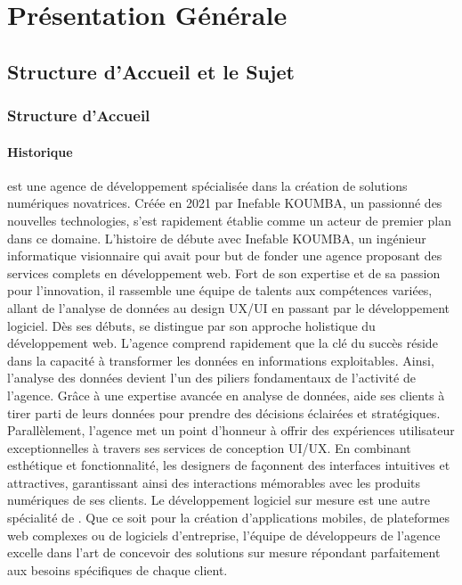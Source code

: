 \part{Présentation Générale}
\chapter{Structure d’Accueil et le Sujet}
\section{Structure d’Accueil}
\subsection{Historique}

\mazf est une agence de développement spécialisée dans la création de solutions
numériques novatrices. Créée en 2021 par Inefable KOUMBA, un passionné des nouvelles
technologies, \mazf s'est rapidement établie comme un acteur de premier plan dans ce domaine.
L'histoire de \mazf débute avec Inefable KOUMBA, un ingénieur informatique
visionnaire qui avait pour but de fonder une agence proposant des services complets
en développement web. Fort de son expertise et de sa passion pour l’innovation,
il rassemble une équipe de talents aux compétences variées, allant de l’analyse
de données au design UX/UI en passant par le développement logiciel.
Dès ses débuts, \mazf se distingue par son approche holistique du développement
web. L’agence comprend rapidement que la clé du succès réside dans la capacité à
transformer les données en informations exploitables. Ainsi, l’analyse des données
devient l’un des piliers fondamentaux de l’activité de l’agence. Grâce à une
expertise avancée en analyse de données, \mazf aide ses clients à tirer
parti de leurs données pour prendre des décisions éclairées et stratégiques.
Parallèlement, l’agence met un point d’honneur à offrir des expériences utilisateur
exceptionnelles à travers ses services de conception UI/UX. En combinant esthétique
et fonctionnalité, les designers de \mazf façonnent des interfaces intuitives
et attractives, garantissant ainsi des interactions mémorables avec les produits
numériques de ses clients. Le développement logiciel sur mesure est une autre
spécialité de \mazf. Que ce soit pour la création d’applications mobiles,
de plateformes web complexes ou de logiciels d’entreprise, l’équipe de développeurs
de l’agence excelle dans l’art de concevoir des solutions sur mesure répondant
parfaitement aux besoins spécifiques de chaque client.

